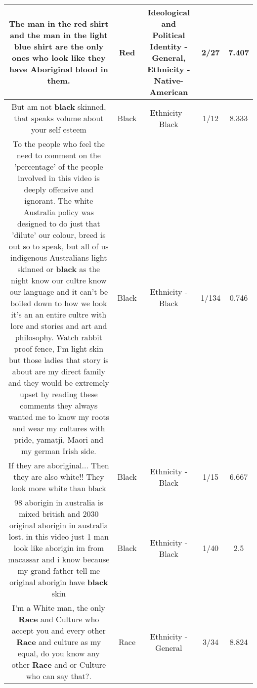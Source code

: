 \documentclass[11pt]{article}
\newlength\mylength
\begin{document}
\begin{center}
\begin{longtable}{|C{.65\mylength}|C{.30\mylength}|C{.12\mylength}|C{.12\mylength}|C{.12\mylength}|}
  \small The man in the \textbf{r\textbf{ed}} shirt and the man in the light blue shirt are the only ones who look like they have Aboriginal blood in them.\normalsize   & Red &  Ideological and Political Identity - General, Ethnicity - Native-American & 2/27 & 7.407 \\  \hline
  \small But am not \textbf{black} skinned, that speaks volume about your self esteem\normalsize   & Black & Ethnicity - Black & 1/12 & 8.333 \\  \hline
  \small To the people who feel the need to comment on the 'percentage' of the people involved in this video is deeply offensive and ignorant. The white Australia policy was designed to do just that 'dilute' our colour, breed is out so to speak, but all of us indigenous Australians light skinned or \textbf{black} as the night know our cultre know our language and it can't be boiled down to how we look it's an an entire cultre with lore and stories and art and philosophy. Watch rabbit proof fence, I'm light skin but those ladies that story is about  are my direct family and they would be extremely upset by reading these comments they always wanted me to know my roots and wear my cultures with pride, yamatji, Maori and my german Irish side.\normalsize   & Black & Ethnicity - Black & 1/134 & 0.746 \\  \hline
  \small If they are aboriginal... Then they are also white!! They look more white than black\normalsize   & Black & Ethnicity - Black & 1/15 & 6.667 \\  \hline
  \small 98 aborigin in australia is mixed british and 2030 original aborigin in australia lost. in this video just 1 man look like aborigin im from macassar and i know because my grand father tell me original aborigin have \textbf{black} skin\normalsize   & Black & Ethnicity - Black & 1/40 & 2.5 \\  \hline
  \small I'm a White man, the only \textbf{Race} and Culture who accept you and every other \textbf{Race} and culture as my equal, do you know any other \textbf{Race} and or Culture who can say that?.\normalsize   & Race & Ethnicity - General & 3/34 & 8.824 \\  \hline

\end{longtable}
\end{center}
\end{document}
